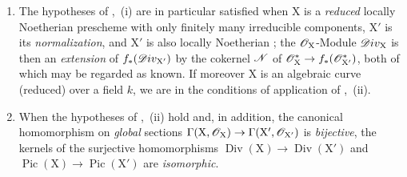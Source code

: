 \begin{remarks}[21.8.6]
\label{IV.21.8.6}
\begin{enumerate}[label=(\roman*)]
  \item The hypotheses of ,{}~(i) are in particular satisfied when $\mathrm{X}$ is a \emph{reduced} locally Noetherian prescheme with only finitely many irreducible components, $\mathrm{X}'$ is its \emph{normalization}, and $\mathrm{X}'$ is also locally Noetherian ;
the $\mathscr{O}_\mathrm{X}$-Module $\mathscr{D}iv_\mathrm{X}$ is then an \emph{extension} of $f_*(\mathscr{D}iv_{\mathrm{X}'})$ by the cokernel $\mathscr{N}$ of $\mathscr{O}^{*}_\mathrm{X}\to f_*(\mathscr{O}^*_{\mathrm{X}'})$, both of which may be regarded as known.
If moreover $\mathrm{X}$ is an algebraic curve (reduced) over a field $k$, we are in the conditions of application of ,{}~(ii).

  \item When the hypotheses of ,{}~(ii) hold and, in addition, the canonical homomorphism on \emph{global} sections $\Gamma(\mathrm{X},\mathscr{O}_\mathrm{X})\to\Gamma(\mathrm{X}',\mathscr{O}_{\mathrm{X}'})$ is \emph{bijective}, the kernels of the surjective homomorphisms $\operatorname{Div}(\mathrm{X})\to\operatorname{Div}(\mathrm{X}')$ and $\operatorname{Pic}(\mathrm{X})\to\operatorname{Pic}(\mathrm{X}')$ are \emph{isomorphic}.


\end{enumerate}
\end{remarks}
